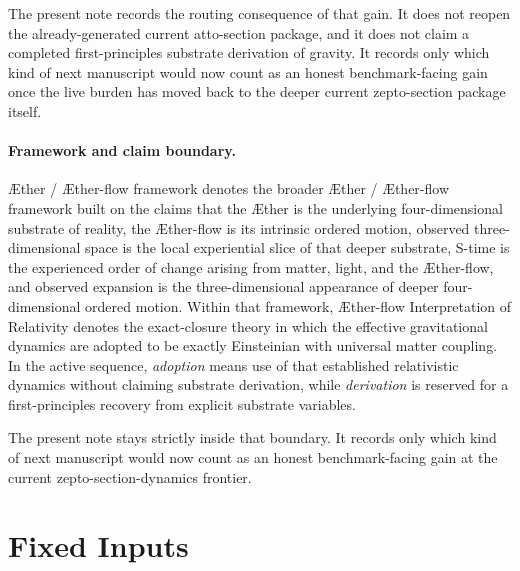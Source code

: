 \documentclass[11pt]{article}
\newcommand{\Aether}{\AE{}ther}
\newcommand{\Aflow}{\AE{}ther-flow}
\newcommand{\TheoryName}{\Aflow{} Interpretation of Relativity}
\newcommand{\TheoryProgram}{\Aether{} / \Aflow{} framework}
\begin{document}
The present note records the routing consequence of that gain. It does not reopen the already-generated current atto-section package, and it does not claim a completed first-principles substrate derivation of gravity. It records only which kind of next manuscript would now count as an honest benchmark-facing gain once the live burden has moved back to the deeper current zepto-section package itself.

\paragraph{Framework and claim boundary.}
\TheoryProgram{} denotes the broader \Aether{} / \Aflow{} framework built on the claims that the \Aether{} is the underlying four-dimensional substrate of reality, the \Aflow{} is its intrinsic ordered motion, observed three-dimensional space is the local experiential slice of that deeper substrate, S-time is the experienced order of change arising from matter, light, and the \Aflow{}, and observed expansion is the three-dimensional appearance of deeper four-dimensional ordered motion. Within that framework, \TheoryName{} denotes the exact-closure theory in which the effective gravitational dynamics are adopted to be exactly Einsteinian with universal matter coupling. In the active sequence, \emph{adoption} means use of that established relativistic dynamics without claiming substrate derivation, while \emph{derivation} is reserved for a first-principles recovery from explicit substrate variables.

The present note stays strictly inside that boundary. It records only which kind of next manuscript would now count as an honest benchmark-facing gain at the current zepto-section-dynamics frontier.

\section{Fixed Inputs}
\end{document}
